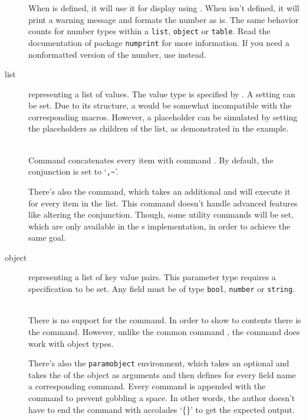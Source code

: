 \documentclass{ltxdoc}
\newcommand\showexample[5][15pt]{%
\begin{minipage}[t]{.5\linewidth - .5 \columnsep}%

\end{minipage}\hspace*{\columnsep}%
\begin{minipage}[t]{.5\linewidth - .5 \columnsep}%

\end{minipage}\\%
}
\begin{document}
\begin{description}
        When \cmd{\numprint} is defined, it will use it for display using \cmd{\param}.
        When \cmd{\numprint} isn't defined, it will print a warning message and formats the number as is.
        The same behavior counts for number types within a \texttt{list}, \texttt{object} or \texttt{table}.
        Read the documentation of package \texttt{numprint} for more information.
        If you need a nonformatted version of the number, use \cmd{\rawparam} instead.
        \item[list] representing a list of values.
        The value type is specified by .
        A  setting can be set.
        Due to its structure, a  would be somewhat incompatible with the corresponding macros.
        However, a placeholder can be simulated by setting the placeholders as children of the  list, as demonstrated in the example.\\
        \showexample{10}{10-15}{4}{4-6}
        \DescribeMacro{\param}
        Command \cmd{\param} concatenates every item with command \cmd{\paramlistconjunction}.
        \DescribeMacro{\paramlistconjunction}
        By default, the conjunction is set to `\texttt{,\textasciitilde}'.

        \DescribeMacro{\forlistitem}
        There's also the \cmd{\forlistitem} command, which takes an additional  and will execute it for every item in the list.
        This command doesn't handle advanced features like altering the conjunction.
        Though, some utility commands will be set, which are only available in the s implementation, in order to achieve the same goal.
        \item[object] representing a list of key value pairs.
        This parameter type requires a  specification to be set.
        Any field must be of type \texttt{bool}, \texttt{number} or \texttt{string}.\\
        \showexample{16}{16-27}{7}{7-10}
        There is no support for the \cmd{\param} command.
        \DescribeMacro{\paramfield}
        In order to show to contents there is the \cmd{\paramfield} command.
        However, unlike the common command \cmd{\param}, the command \cmd{\hasparam} does work with object types.

         There's also the \texttt{paramobject} environment, which takes an optional  and takes the  of the object as arguments and then defines for every field name a corresponding command.
        Every command is appended with the \cmd{\xspace} command to prevent gobbling a space.
        In other words, the author doesn't have to end the command with accolades `\{\}' to get the expected output.


\end{description}
\end{document}
